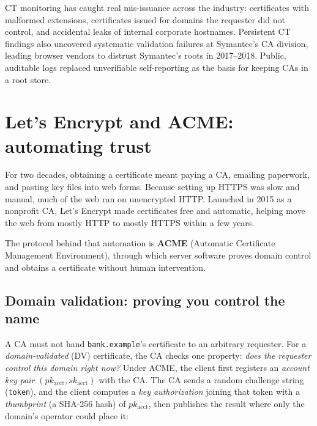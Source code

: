\begin{applicationbox}
CT monitoring has caught real mis-issuance across the industry: certificates with malformed extensions, certificates issued for domains the requester did not control, and accidental leaks of internal corporate hostnames. Persistent CT findings also uncovered systematic validation failures at Symantec's CA division, leading browser vendors to distrust Symantec's roots in 2017--2018. Public, auditable logs replaced unverifiable self-reporting as the basis for keeping CAs in a root store.
\end{applicationbox}

\section{Let's Encrypt and ACME: automating trust}
\label{ch24:acme}

For two decades, obtaining a certificate meant paying a CA, emailing paperwork, and pasting key files into web forms. Because setting up HTTPS was slow and manual, much of the web ran on unencrypted HTTP. Launched in 2015 as a nonprofit CA, Let's Encrypt made certificates free and automatic, helping move the web from mostly HTTP to mostly HTTPS within a few years.

The protocol behind that automation is \textbf{ACME} (Automatic Certificate Management Environment), through which server software proves domain control and obtains a certificate without human intervention.

\subsection{Domain validation: proving you control the name}

A CA must not hand \texttt{bank.example}'s certificate to an arbitrary requester. For a \emph{domain-validated} (DV) certificate, the CA checks one property: \emph{does the requester control this domain right now?} Under ACME, the client first registers an \emph{account key pair} $(pk_{\mathrm{acct}}, sk_{\mathrm{acct}})$ with the CA. The CA sends a random challenge string (\texttt{token}), and the client computes a \emph{key authorization} joining that token with a \emph{thumbprint} (a SHA-256 hash) of $pk_{\mathrm{acct}}$, then publishes the result where only the domain's operator could place it:

